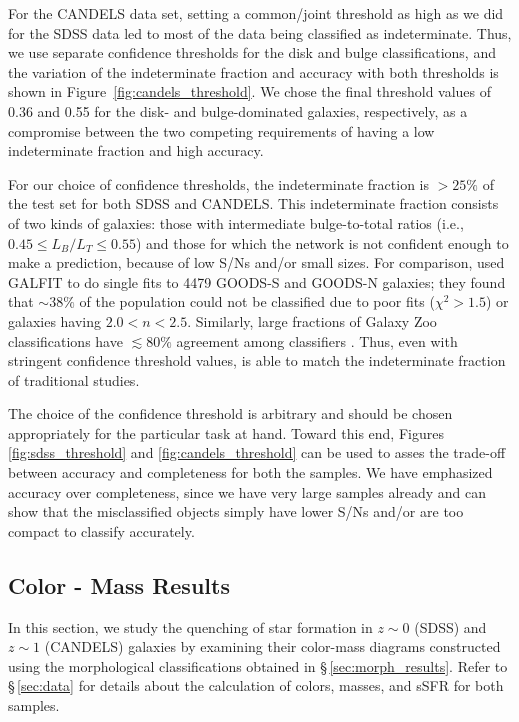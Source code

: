 For the CANDELS data set, setting a common/joint threshold as high as we did for the SDSS data led to most of the data being classified as indeterminate. Thus, we use separate confidence thresholds for the disk and bulge classifications, and the variation of the indeterminate fraction and accuracy with both thresholds is shown in Figure~\ref{fig:candels_threshold}. We chose the final threshold values of 0.36 and 0.55 for the disk- and bulge-dominated galaxies, respectively, as a compromise between the two competing requirements of having a low indeterminate fraction and high accuracy. 

For our choice of confidence thresholds, the indeterminate fraction is $> 25\%$ of the test set for both SDSS and CANDELS. This indeterminate fraction consists of two kinds of galaxies: those with intermediate bulge-to-total ratios (i.e., $0.45 \leq L_B/L_T \leq 0.55$) and those for which the network is not confident enough to make a prediction, because of low S/Ns and/or small sizes. For comparison, \citet{powell_17} used GALFIT to do single \sersic{} fits to 4479 GOODS-S and GOODS-N galaxies; they found that $\sim 38\%$ of the population could not be classified due to poor fits ($\chi^2 > 1.5$) or galaxies having $2.0 < n < 2.5$. Similarly, large fractions of Galaxy Zoo classifications have $\lesssim 80\%$ agreement among classifiers \citep{land_2008}. Thus, even with stringent confidence threshold values, \gamornet{} is able to match the indeterminate fraction of traditional studies. 

The choice of the confidence threshold is arbitrary and should be chosen appropriately for the particular task at hand. Toward this end, Figures \ref{fig:sdss_threshold} and \ref{fig:candels_threshold} can be used to asses the trade-off between accuracy and completeness for both the samples. We have emphasized accuracy over completeness, since we have very large samples already and can show that the misclassified objects simply have lower S/Ns and/or are too compact to classify accurately.

\vspace{1.0cm}

\subsection{Color - Mass Results}\label{sec:cm_results}
In this section, we study the quenching of star formation in  $z\sim0$ (SDSS) and $z\sim1$ (CANDELS) galaxies by examining their color-mass diagrams constructed using the morphological classifications obtained in \S\,\ref{sec:morph_results}. Refer to \S\,\ref{sec:data} for details about the calculation of colors, masses, and sSFR for both samples. 

